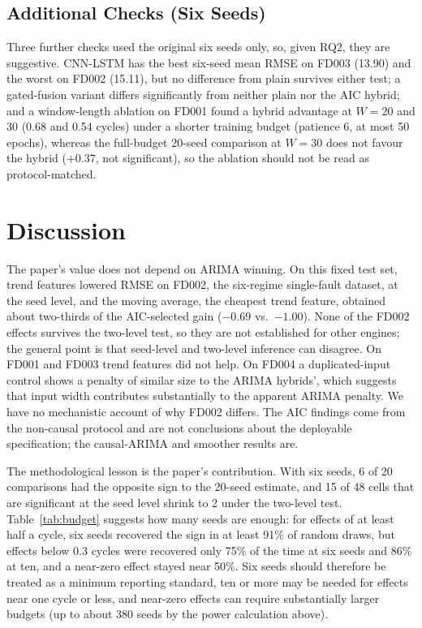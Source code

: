 \documentclass[conference]{IEEEtran}
\begin{document}
\subsection{Additional Checks (Six Seeds)}
Three further checks used the original six seeds only, so, given RQ2, they are suggestive. CNN-LSTM has the best six-seed mean RMSE on FD003 (13.90) and the worst on FD002 (15.11), but no difference from plain survives either test; a gated-fusion variant differs significantly from neither plain nor the AIC hybrid; and a window-length ablation on FD001 found a hybrid advantage at $W=20$ and $30$ (0.68 and 0.54 cycles) under a shorter training budget (patience 6, at most 50 epochs), whereas the full-budget 20-seed comparison at $W=30$ does not favour the hybrid ($+0.37$, not significant), so the ablation should not be read as protocol-matched.

\section{Discussion}
The paper's value does not depend on ARIMA winning. On this fixed test set, trend features lowered RMSE on FD002, the six-regime single-fault dataset, at the seed level, and the moving average, the cheapest trend feature, obtained about two-thirds of the AIC-selected gain ($-0.69$ vs.\ $-1.00$). None of the FD002 effects survives the two-level test, so they are not established for other engines; the general point is that seed-level and two-level inference can disagree. On FD001 and FD003 trend features did not help. On FD004 a duplicated-input control shows a penalty of similar size to the ARIMA hybrids', which suggests that input width contributes substantially to the apparent ARIMA penalty. We have no mechanistic account of why FD002 differs. The AIC findings come from the non-causal protocol and are not conclusions about the deployable specification; the causal-ARIMA and smoother results are.

The methodological lesson is the paper's contribution. With six seeds, 6 of 20 comparisons had the opposite sign to the 20-seed estimate, and 15 of 48 cells that are significant at the seed level shrink to 2 under the two-level test. Table~\ref{tab:budget} suggests how many seeds are enough: for effects of at least half a cycle, six seeds recovered the sign in at least 91\% of random draws, but effects below 0.3 cycles were recovered only 75\% of the time at six seeds and 86\% at ten, and a near-zero effect stayed near 50\%. Six seeds should therefore be treated as a minimum reporting standard, ten or more may be needed for effects near one cycle or less, and near-zero effects can require substantially larger budgets (up to about 380 seeds by the power calculation above).
\end{document}
